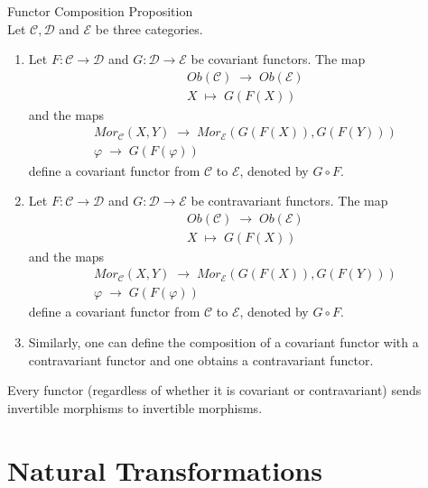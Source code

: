 \begin{proposition}{Functor Composition Proposition}\\
Let $\mathcal{C},\mathcal{D}$ and $\mathcal{E}$ be three categories.
\begin{enumerate}
    \item Let $F: \mathcal{C} \to \mathcal{D}$ and $G: \mathcal{D} \to  \mathcal{E}$ be covariant functors. The map
    $$\substack{Ob(\mathcal{C}) \; \to \; Ob(\mathcal{E})\\
    X \; \mapsto \; G(F(X))}$$
    and the maps
    $$\substack{Mor_\mathcal{C} (X,Y) \; \to \; Mor_\mathcal{E} (G(F(X)) , G(F(Y)))\\
    \varphi \; \to \; G(F(\varphi))}$$
    define a covariant functor from $\mathcal{C}$ to $\mathcal{E}$, denoted by $G \circ F$.

    \item Let $F: \mathcal{C} \to \mathcal{D}$ and $G: \mathcal{D} \to  \mathcal{E}$ be contravariant functors. The map
    $$\substack{Ob(\mathcal{C}) \; \to \; Ob(\mathcal{E})\\
    X \; \mapsto \; G(F(X))}$$
    and the maps
    $$\substack{Mor_\mathcal{C} (X,Y) \; \to \; Mor_\mathcal{E} (G(F(X)) , G(F(Y)))\\
    \varphi \; \to \; G(F(\varphi))}$$
    define a covariant functor from $\mathcal{C}$ to $\mathcal{E}$, denoted by $G \circ F$.
    \item Similarly, one can define the composition of a covariant functor with a contravariant functor and one obtains a contravariant functor.
\end{enumerate}
\end{proposition}


\begin{proposition}
    Every functor (regardless of whether it is covariant or contravariant) sends invertible morphisms to invertible morphisms.
\end{proposition}

\section{Natural Transformations}

